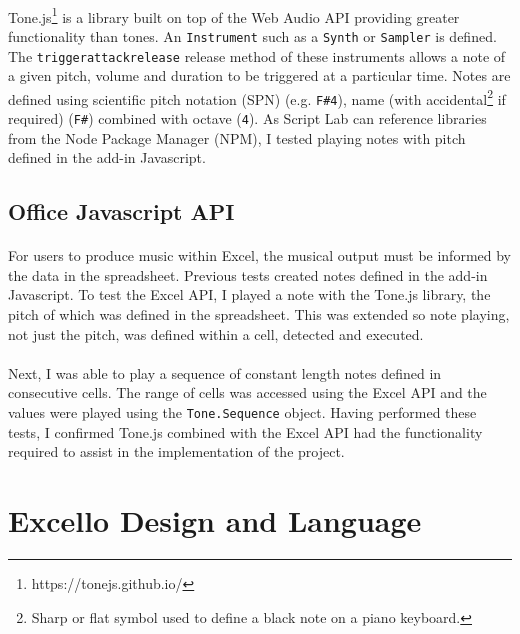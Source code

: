 \paragraph{} Tone.js\footnote{https://tonejs.github.io/} is a library built on top of the Web Audio API providing greater functionality than tones. An \texttt{Instrument} such as a \texttt{Synth} or \texttt{Sampler} is defined. The \texttt{triggerattackrelease} release method of these instruments allows a note of a given pitch, volume and duration to be triggered at a particular time. Notes are defined using scientific pitch notation (SPN) (e.g. \texttt{F\#4}), name (with accidental\footnote{Sharp or flat symbol used to define a black note on a piano keyboard.} if required) (\texttt{F\#}) combined with octave (\texttt{4}). As Script Lab can reference libraries from the Node Package Manager (NPM), I tested playing notes with pitch defined in the add-in Javascript.

\subsection{Office Javascript API}

\paragraph{} For users to produce music within Excel, the musical output must be informed by the data in the spreadsheet. Previous tests created notes defined in the add-in Javascript. To test the Excel API, I played a note with the Tone.js library, the pitch of which was defined in the spreadsheet. This was extended so note playing, not just the pitch, was defined within a cell, detected and executed.

\paragraph{} Next, I was able to play a sequence of constant length notes defined in consecutive cells. The range of cells was accessed using the Excel API and the values were played using the \texttt{Tone.Sequence} object. Having performed these tests, I confirmed Tone.js combined with the Excel API had the functionality required to assist in the implementation of the project.

\section{Excello Design and Language}

